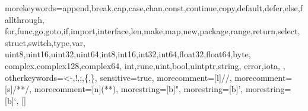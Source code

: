 \nobibintoc
\renewcommand*{\indexmark}{%
\markboth{\myfamily \typename{} \thechapter: \indexname}{\myfamily\indexname}%
}

\onecolindexfalse  %
\noindexintoc
\makeindex

\newcommand{\qquote}{{\scalefont{4.00}{``}}}
\expandafter\def\expandafter\quote\expandafter{\quote\em}


  {morekeywords={append,break,cap,case,chan,const,continue,copy,default,defer,else,fallthrough,%
  for,func,go,goto,if,import,interface,len,make,map,new,package,range,return,select,%
  struct,switch,type,var,%
  uint8,uint16,uint32,uint64,int8,int16,int32,int64,float32,float64,byte,%
  complex,complex128,complex64,%
  int,rune,uint,bool,uintptr,string,%
  error,iota,%
  },%
  otherkeywords={<-,!,;,\{,\}},%
    sensitive=true,%
    morecomment=[l]{//},%
    morecomment=[s]{/*}{*/},%
    morecomment=[n]{(*}{*)},%
    morestring=[b]",%
    morestring=[b]',%
    morestring=[b]`,%
  }[]%
\lstset{language=Go,inputencoding=utf8,extendedchars=false,texcl,escapechar=\|,basicstyle=\ttfamily,keywordstyle=\bfseries,numbers=none,numberblanklines=false,showstringspaces=false,breaklines=true,numberstyle=\small\ttfamily,xleftmargin=\parindent,xrightmargin=1em,linewidth=0.98\linewidth}

\newcommand{\coderemark}[1]{\qquad$\leftarrow \textit{\small #1}$}


\renewcommand{\ExerciseHeaderTitle}{\ExerciseTitle}
\renewcommand{\ExerciseHeaderLabel}{}
\renewcommand{\ExerciseName}{}	%
\renewcommand{\ExerciseHeaderNB}{\theExercise}
\renewcommand{\ExerciseHeader}{\vspace{.7ex}\noindent\textbf{Q\theExercise}. (\number\ExerciseDifficulty) \ExerciseTitle\quad%
\addcontentsline{ex}{exercise}{\numberline{\theExercise}(\number\ExerciseDifficulty) \ExerciseTitle}}
\renewcommand{\AnswerHeader}{\vspace{.7ex}\noindent\textbf{A\theExercise}.  (\number\ExerciseDifficulty) \ExerciseTitle\quad}

